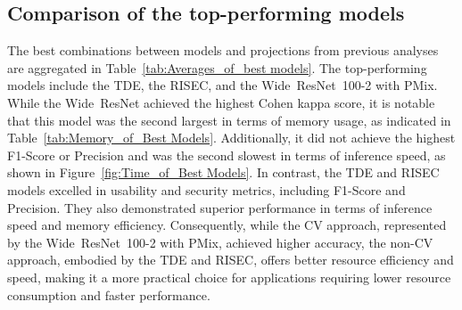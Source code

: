 





\FloatBarrier

\subsection{Comparison of the top-performing models}


The best combinations between models and projections from previous analyses are aggregated in Table~\ref{tab:Averages_of_best models}. The top-performing models include the \gls{TDE}, the \gls{RISEC}, and the \mbox{Wide ResNet 100-2} with \gls{PMix}. While the \mbox{Wide ResNet} achieved the highest Cohen kappa score, it is notable that this model was the second largest in terms of memory usage, as indicated in Table~\ref{tab:Memory_of_Best Models}. Additionally, it did not achieve the highest F1-Score or Precision and was the second slowest in terms of inference speed, as shown in Figure~\ref{fig:Time_of_Best Models}. In contrast, the \gls{TDE} and \gls{RISEC} models excelled in usability and security metrics, including F1-Score and Precision. They also demonstrated superior performance in terms of inference speed and memory efficiency. Consequently, while the \gls{CV} approach, represented by the \mbox{Wide ResNet 100-2} with \gls{PMix}, achieved higher accuracy, the non-\gls{CV} approach, embodied by the \gls{TDE} and \gls{RISEC}, offers better resource efficiency and speed, making it a more practical choice for applications requiring lower resource consumption and faster performance.


